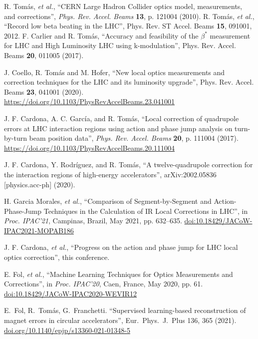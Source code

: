 \documentclass{cernatsnote}
\begin{document}
\begin{thebibliography}{99}
R. Tomás, {\it et al.}, “CERN Large Hadron Collider optics
model, measurements, and corrections”, {\it Phys. Rev. Accel. Beams}  {\bf 13}, p. 121004 (2010).
%
 R. Tom\'as, {\it et al.}, ``Record low beta beating in the LHC'',
Phys. Rev. ST Accel. Beams {\bf15}, 091001, 2012.
%
 F. Carlier and R. Tom\'as, ``Accuracy and feasibility of the $\beta^*$ measurement for LHC and High Luminosity LHC using k-modulation'',
Phys. Rev. Accel. Beams {\bf20}, 011005 (2017).
%


J. Coello, R. Tom\'as and M. Hofer, ``New local optics measurements and correction techniques for the LHC and its luminosity upgrade'', Phys. Rev. Accel. Beams {\bf 23}, 041001 (2020).
\url{https://doi.org/10.1103/PhysRevAccelBeams.23.041001}

 J. F.  Cardona, A. C. Garc\'ia, and R. Tom\'as, ``Local correction of quadrupole errors at LHC interaction regions using action and phase jump analysis on turn-by-turn beam position data'', {\it Phys. Rev. Accel. Beams} {\bf 20}, p. 111004 (2017).
\url{https://doi.org/10.1103/PhysRevAccelBeams.20.111004}

 J. F.  Cardona, Y. Rodr\'iguez, and R. Tom\'as, ``A twelve-quadrupole correction for the interaction regions of high-energy accelerators'',  arXiv:2002.05836 [physics.acc-ph] (2020).

   H. Garcia Morales, {\it et al.},
   \textquotedblleft{Comparison of Segment-by-Segment and Action-Phase-Jump Techniques in the Calculation of IR Local Corrections in LHC}\textquotedblright,
   in \emph{Proc. IPAC’21}, Campinas, Brazil, May 2021, pp. 632--635.
   \url{doi:10.18429/JACoW-IPAC2021-MOPAB186}  

 J. F. Cardona, {\it et al.}, ``Progress on the action and phase jump for LHC local optics correction'', this conference.


  E. Fol, {\it et al.},
   \textquotedblleft{Machine Learning Techniques for Optics Measurements and Corrections}\textquotedblright,
   in \emph{Proc. IPAC’20}, Caen, France, May 2020, pp. 61.
   \url{doi:10.18429/JACoW-IPAC2020-WEVIR12} 

 E.~Fol, R.~Tom\'as,  G.~Franchetti. ``Supervised learning-based reconstruction of magnet errors in circular accelerators'', Eur.~Phys.~J.~Plus 136, 365 (2021). \url{doi.org/10.1140/epjp/s13360-021-01348-5}


\end{thebibliography}
\end{document}
